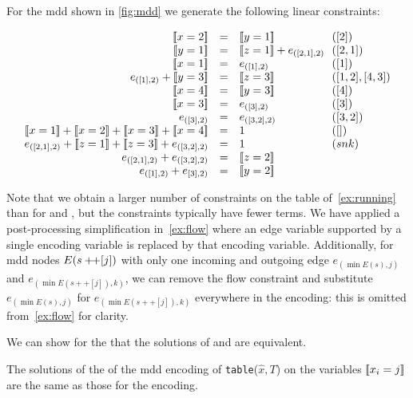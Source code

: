 \documentclass[a4paper,UKenglish,cleveref,autoref,thm-restate]{lipics-v2021}
\begin{document}
\begin{example} \label{ex:flow}
For the \gls{mdd} shown in \cref{fig:mdd}
we generate the following linear constraints:

\begin{equation*}
\begin{array}{rcl@{~~}l}
\be{1}{2} &= &\be{2}{1} & ([2])\\
\be{2}{1} &= &\be{3}{1} + e_{([2,1],2)} &([2,1]) \\
\be{1}{1} &= &e_{([1],2)} & ([1])\\
e_{([1],2)} + \be{2}{3} &=& \be{3}{3} & ([1,2], [4,3]) \\
\be{1}{4} & = & \be{2}{3} & ([4]) \\
\be{1}{3} &=& e_{([3],2)}  & ([3])\\
e_{([3],2)} &=& e_{([3,2],2)} & ([3,2])\\
\be{1}{1} + \be{1}{2} + \be{1}{3} + \be{1}{4} &= &1 & ([]) \\
e_{([2,1],2)} + \be{3}{1} + \be{3}{3} + e_{([3,2],2)} &=& 1 & (snk)\\
e_{([2,1],2)} + e_{([3,2],2)} & = &\be{3}{2} \\
e_{([1],2)} + e_{[3],2)} & = &\be{2}{2} \\
\end{array}
\end{equation*}

Note that we obtain a larger number of constraints on the table of~\cref{ex:running} than for \baseGleb and \baseBool, but the constraints typically have fewer terms. We have applied a post-processing simplification in~\cref{ex:flow} where an edge variable supported by a single encoding variable is replaced by that encoding variable. Additionally, for \gls{mdd} nodes $E(s +\!\!+ [j])$ with only one incoming and outgoing edge $e_{(\min E(s), j)}$ and $e_{(\min E(s ++ [j]), k)}$, we can remove the flow constraint and substitute $e_{(\min E(s), j)}$ for $e_{(\min E(s ++ [j]), k)}$ everywhere in the encoding: this is omitted from~\cref{ex:flow} for clarity.
\end{example}

We can show for the \relaxation that the solutions of \baseMdd and \baseBool are equivalent.  

\begin{theorem}
    The solutions of the \relaxation of the \gls{mdd} encoding of \texttt{table}($\hat{x},T$) on the variables $[\![x_i = j]\!]$ are the same as those for the \baseBool encoding.
\end{theorem}
\end{document}
